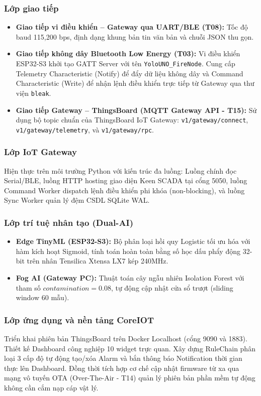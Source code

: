 \subsubsection{Lớp giao tiếp}
\begin{itemize}
    \item \textbf{Giao tiếp vi điều khiển -- Gateway qua UART/BLE (T08):} Tốc độ baud 115,200 bps, định dạng khung bản tin văn bản và chuỗi JSON thu gọn.
    \item \textbf{Giao tiếp không dây Bluetooth Low Energy (T03):} Vi điều khiển ESP32-S3 khởi tạo GATT Server với tên \texttt{YoloUNO\_FireNode}. Cung cấp Telemetry Characteristic (Notify) để đẩy dữ liệu không dây và Command Characteristic (Write) để nhận lệnh điều khiển trực tiếp từ Gateway qua thư viện \texttt{bleak}.
    \item \textbf{Giao tiếp Gateway -- ThingsBoard (MQTT Gateway API - T15):} Sử dụng bộ topic chuẩn của ThingsBoard IoT Gateway:
    \texttt{v1/gateway/connect}, \texttt{v1/gateway/telemetry}, và \texttt{v1/gateway/rpc}.
\end{itemize}
\subsubsection{Lớp IoT Gateway}
Hiện thực trên môi trường Python với kiến trúc đa luồng: Luồng chính đọc Serial/BLE, luồng HTTP hosting giao diện Keen SCADA tại cổng 5050, luồng Command Worker dispatch lệnh điều khiển phi khóa (non-blocking), và luồng Sync Worker quản lý đệm CSDL SQLite WAL.
\subsubsection{Lớp trí tuệ nhân tạo (Dual-AI)}
\begin{itemize}
    \item \textbf{Edge TinyML (ESP32-S3):} Bộ phân loại hồi quy Logistic tối ưu hóa với hàm kích hoạt Sigmoid, tính toán hoàn toàn bằng số học dấu phẩy động 32-bit trên nhân Tensilica Xtensa LX7 kép 240MHz.
    \item \textbf{Fog AI (Gateway PC):} Thuật toán cây ngẫu nhiên Isolation Forest với tham số $contamination=0.08$, tự động cập nhật cửa sổ trượt (sliding window 60 mẫu).
\end{itemize}
\subsubsection{Lớp ứng dụng và nền tảng CoreIOT}
Triển khai phiên bản ThingsBoard trên Docker Localhost (cổng 9090 và 1883). Thiết kế Dashboard công nghiệp 10 widget trực quan. Xây dựng RuleChain phân loại 3 cấp độ tự động tạo/xóa Alarm và bắn thông báo Notification thời gian thực lên Dashboard. Đồng thời tích hợp cơ chế cập nhật firmware từ xa qua mạng vô tuyến OTA (Over-The-Air - T14) quản lý phiên bản phần mềm tự động không cần cắm nạp cáp vật lý.
